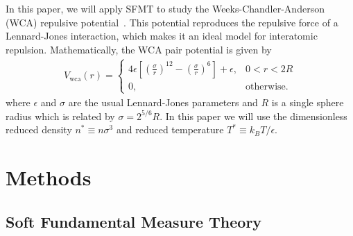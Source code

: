 \documentclass[letterpaper,twocolumn,amsmath,amssymb,prb]{revtex4-1}
\begin{document}
In this paper, we will apply SFMT to study the Weeks-Chandler-Anderson
(WCA) repulsive potential~\cite{weeks1971}.  This potential reproduces
the repulsive force of a Lennard-Jones interaction, which makes it an
ideal model for interatomic repulsion.  Mathematically, the WCA
pair potential is given by
\newcommand\erf{\mathrm{erf}}
\newcommand\Vwca{V_{\mathrm{wca}}}
\newcommand\Verf{V_{\erf}}
\begin{align}
  \Vwca(r) =
  \begin{cases}
    4\epsilon \left[ \left(\frac{\sigma}{r}\right)^{12} -
    \left(\frac{\sigma}{r}\right)^{6} \right] + \epsilon, & 0 < r < 2R \\
    0, & \textrm{otherwise}.
  \end{cases}
\label{eq:Vwca}
\end{align}
where $\epsilon$ and $\sigma$ are the usual Lennard-Jones parameters
and $R$ is a single sphere radius which is related by $\sigma =
2^{5/6} R$. In this paper we will use the dimensionless reduced
density $n^* \equiv n \sigma^3$ and reduced temperature $T^* \equiv
k_BT/\epsilon$.

\section{Methods}

\subsection{Soft Fundamental Measure Theory}
\end{document}
